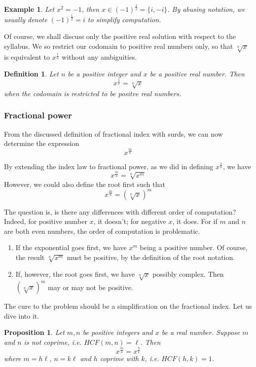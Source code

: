 \documentclass[12pt]{article}
\newtheorem{definition}{Definition}[section]
\newtheorem*{proposition}{Proposition}
\newtheorem*{example}{Example}
\begin{document}
    \begin{example}
        Let $x^2=-1$, then $x\in (-1)^{\frac{1}{2}}=\{i,-i\}$. By abusing notation, we usually denote $(-1)^{\frac{1}{2}}=i$ to simplify computation.
    \end{example}

    Of course, we shall discuss only the positive real solution with respect to the syllabus. We so restrict our codomain to positive real numbers only, so that $\sqrt[n]{x}$ is equivalent to $x^{\frac{1}{n}}$ without any ambiguities.

    \begin{definition}
        Let $n$ be a positive integer and $x$ be a positive real number. Then $$x^{\frac{1}{n}}=\sqrt[n]{x}$$ when the codomain is restricted to be positve real numbers.
    \end{definition}

    \subsubsection*{Fractional power}

    From the discussed definition of fractional index with surds, we can now determine the expression $$x^{\frac{m}{n}}$$

    By extending the index law to fractional power, as we did in defining $x^{\frac{1}{n}}$, we have $$x^{\frac{m}{n}}=\sqrt[n]{x^m}$$
    However, we could also define the root first such that $$x^{\frac{m}{n}}=(\sqrt[n]{x})^m$$

    The question is, is there any differences with different order of computation? Indeed, for positive number $x$, it doesn't; for negative $x$, it does. For if $m$ and $n$ are both even numbers, the order of computation is problematic.\begin{enumerate}
        \item If the exponential goes first, we have $x^m$ being a positive number. Of course, the result $\sqrt[n]{x^m}$ must be positive, by the definition of the root notation.
        \item If, however, the root goes first, we have $\sqrt[n]{x}$ possibly complex. Then $(\sqrt[n]{x})^m$ may or may not be positive.
    \end{enumerate}

    The cure to the problem should be a simplification on the fractional index. Let us dive into it.

    \begin{proposition}
        Let $m,n$ be positive integers and $x$ be a real number. Suppose $m$ and $n$ is not coprime, i.e. $HCF(m,n)=\ell$. Then $$x^{\frac{m}{n}}=x^{\frac{h}{k}}$$ where $m=h\ell$, $n=k\ell$ and $h$ coprime with $k$, i.e. $HCF(h,k)=1$.
    \end{proposition}
\end{document}
